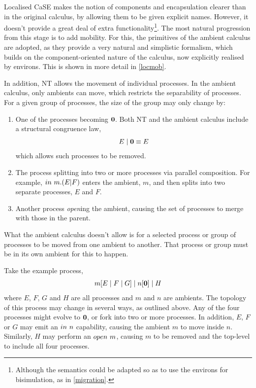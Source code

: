 Localised CaSE makes the notion of components and encapsulation clearer
than in the original calculus, by allowing them to be given explicit
names.  However, it doesn't provide a great deal of extra
functionality\footnote{Although the semantics could be adapted so as to
use the environs for bisimulation, as in \ref{migration}.}.  The most
natural progression from this stage is to add mobility.  For this, the
primitives of the ambient calculus are adopted, as they provide a very
natural and simplistic formalism, which builds on the component-oriented
nature of the calculus, now explicitly realised by environs.  This is
shown in more detail in \ref{locmob}.

In addition, NT allows the movement of individual processes.  In the
ambient calculus, only ambients can move, which restricts the
separability of processes.  For a given group of processes, the
size of the group may only change by:

\begin{enumerate}
\item One of the processes becoming $\textbf{0}$.  Both NT and the ambient
      calculus include a structural congruence law,
\begin{equation}
E\;|\;\textbf{0} \equiv E
\end{equation}
      which allows such processes to be removed.
\item The process splitting into two or more processes via parallel
      composition.  For example, $in\ m.(E | F)$ enters the ambient, $m$,
      and then splits into two separate processes, $E$ and $F$.
\item Another process \emph{open}ing the ambient, causing the set of
      processes to merge with those in the parent.
\end{enumerate}

What the ambient calculus doesn't allow is for a selected process or
group of processes to be moved from one ambient to another.  That
process or group must be in its own ambient for this to happen.

Take the example process, 
\begin{equation}
m[E\;|\;F\;|\;G]\;|\;n[\textbf{0}]\;|\;H
\end{equation}
where $E$, $F$, $G$ and $H$ are all processes and $m$ and $n$
are ambients.  The topology of this process may change in several ways, as
outlined above. Any of the four processes might evolve to $\textbf{0}$, or fork
into two or more processes.  In addition, $E$, $F$ or $G$ may emit an
$in\ n$ capability, causing the ambient $m$ to move inside $n$.
Similarly, $H$ may perform an $open\ m$, causing $m$ to be removed and
the top-level to include all four processes.

